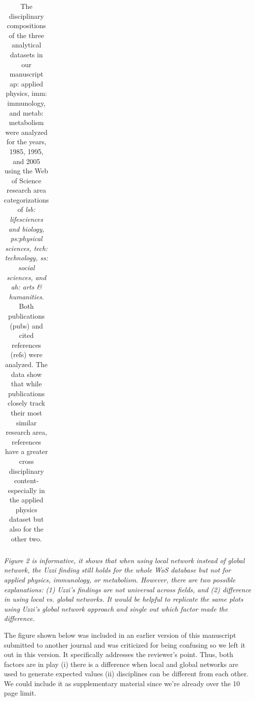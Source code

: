 \documentclass[11pt, oneside]{article}   	%
\begin{document}
\begin{table}[ht!]
{\begin{tabular}{|r rllrrrrrrr r|}
   \hline
\end{tabular}
}
\caption{The disciplinary compositions of the three analytical datasets in our manuscript ap: applied physics, imm: immunology, and metab: metabolism were analyzed for the years, 1985, 1995, and 2005 using the Web of Science research area categorizations of \emph{lsb: lifesciences and biology, ps:physical sciences, tech: technology, ss: social sciences, and ah: arts \& humanities}. Both publications (pubs) and cited references (refs) were analyzed. The data show that while publications closely track their most similar research area, references have a greater cross disciplinary content- especially in the applied physics dataset but also for the other two. }
\end{table}

\newpage

\emph{Figure 2 is informative, it shows that when using local network instead of global network, the Uzzi finding still holds for the whole WoS database but not for applied physics, immunology, or metabolism. However, there are two possible explanations: (1) Uzzi's findings are not universal across fields, and (2) difference in using local vs. global networks.  It would be helpful to replicate the same plots using Uzzi's global network approach and single out which factor made the difference.}

The figure shown below was included in an earlier version of this manuscript submitted to another journal and was criticized for being confusing so we left it out in this version. It specifically addresses the reviewer's point. Thus, both factors are in play (i) there is a difference when local and global networks are used to generate expected values (ii)  disciplines can be different from each other. We could include it as supplementary material since we're already over the 10 page limit. \newpage 
\end{document}
